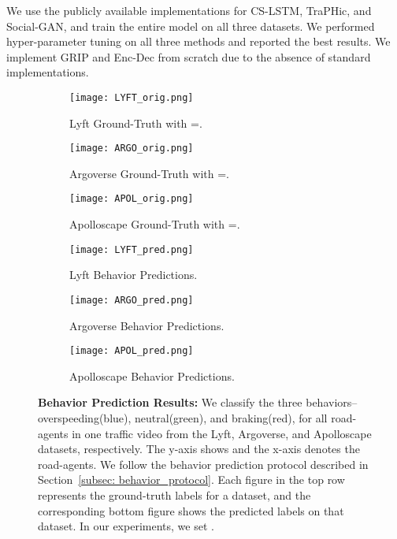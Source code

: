 \documentclass[10pt,twocolumn,letterpaper]{article}
\theoremstyle{plain}
\begin{document}
We use the publicly available implementations for CS-LSTM, TraPHic, and Social-GAN, and train the entire model on all three datasets. We performed hyper-parameter tuning on all three methods and reported the best results. We implement GRIP and Enc-Dec from scratch due to the absence of standard implementations.
\begin{figure*}
  \begin{subfigure}[h]{0.34\textwidth}
    \texttt{[image: LYFT\_orig.png]}
    \caption{Lyft Ground-Truth with =.}
    \label{fig:1}
  \end{subfigure}
\begin{subfigure}[h]{0.34\textwidth}
    \texttt{[image: ARGO\_orig.png]}
    \caption{Argoverse Ground-Truth with =.}
    \label{fig:1}
  \end{subfigure}
\begin{subfigure}[h]{0.34\textwidth}
    \texttt{[image: APOL\_orig.png]}
    \caption{Apolloscape Ground-Truth with =.}
    \label{fig:2}
  \end{subfigure}

  \begin{subfigure}[h]{0.34\textwidth}
    \texttt{[image: LYFT\_pred.png]}
    \caption{Lyft Behavior Predictions.}
    \label{fig:1}
  \end{subfigure}
\begin{subfigure}[h]{0.34\textwidth}
    \texttt{[image: ARGO\_pred.png]}
    \caption{Argoverse Behavior Predictions.}
    \label{fig:1}
  \end{subfigure}
\begin{subfigure}[h]{0.34\textwidth}
    \texttt{[image: APOL\_pred.png]}
    \caption{Apolloscape Behavior Predictions.}
    \label{fig:2}
  \end{subfigure}
  \caption{\textbf{Behavior Prediction Results:} We classify the three behaviors-- overspeeding(blue), neutral(green), and braking(red), for all road-agents in one traffic video from the Lyft, Argoverse, and Apolloscape datasets, respectively. The y-axis shows  and the x-axis denotes the road-agents. We follow the behavior prediction protocol described in Section~\ref{subsec: behavior_protocol}. Each figure in the top row represents the ground-truth labels for a dataset, and the corresponding bottom figure shows the predicted labels on that dataset. In our experiments, we set .}
  \label{fig: behavior}
  \vspace{-15pt}
\end{figure*}
 
\end{document}
